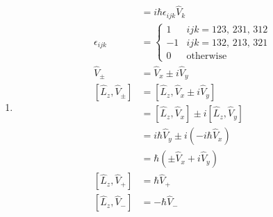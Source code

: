\documentclass{article}
\begin{document}
\begin{enumerate}
  \item

        \begin{align*}
          [\hat{L}_i, \hat{V}_j]   & = i \hbar \epsilon_{i j k} \hat{V}_k                  \\
          \epsilon_{i j k}         & = \begin{cases}
                                         1  & i j k = 123, \,231, \,312 \\
                                         -1 & i j k = 132, \,213, \,321 \\
                                         0  & \text{otherwise}
                                       \end{cases}                      \\
          \hat{V}_\pm              & = \hat{V}_x \pm i \hat{V}_y                           \\
          [\hat{L}_z, \hat{V}_\pm] & = [\hat{L}_z, \hat{V}_x \pm i \hat{V}_y]              \\
                                   & = [\hat{L}_z, \hat{V}_x] \pm i [\hat{L}_z, \hat{V}_y] \\
                                   & = i \hbar \hat{V}_y \pm i (-i \hbar \hat{V}_x)        \\
                                   & = \hbar (\pm \hat{V}_x + i \hat{V}_y)                 \\
          [\hat{L}_z, \hat{V}_+]   & = \hbar \hat{V}_+                                     \\
          [\hat{L}_z, \hat{V}_-]   & = -\hbar \hat{V}_-
        \end{align*}
\end{enumerate}

\subsection{}
\end{document}
